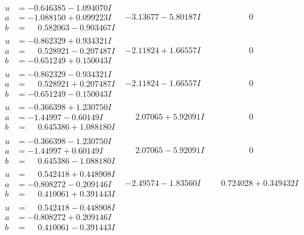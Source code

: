 \documentclass[1p]{elsarticle_modified}
\theoremstyle{definition}
\begin{document}
$$\begin{array}{c|c|c}
\begin{aligned}
u &= -0.646385 - 1.094070 I \\
a &= -1.088150 + 0.099223 I \\
b &= \phantom{-}0.582063 - 0.903467 I\end{aligned}
 & -3.13677 - 5.80187 I & \phantom{-0.000000 } 0 \\ \hline\begin{aligned}
u &= -0.862329 + 0.934321 I \\
a &= \phantom{-}0.528921 - 0.207487 I \\
b &= -0.651249 + 0.150043 I\end{aligned}
 & -2.11824 + 1.66557 I & \phantom{-0.000000 } 0 \\ \hline\begin{aligned}
u &= -0.862329 - 0.934321 I \\
a &= \phantom{-}0.528921 + 0.207487 I \\
b &= -0.651249 - 0.150043 I\end{aligned}
 & -2.11824 - 1.66557 I & \phantom{-0.000000 } 0 \\ \hline\begin{aligned}
u &= -0.366398 + 1.230750 I \\
a &= -1.44997 - 0.60149 I \\
b &= \phantom{-}0.645386 + 1.088180 I\end{aligned}
 & \phantom{-}2.07065 + 5.92091 I & \phantom{-0.000000 } 0 \\ \hline\begin{aligned}
u &= -0.366398 - 1.230750 I \\
a &= -1.44997 + 0.60149 I \\
b &= \phantom{-}0.645386 - 1.088180 I\end{aligned}
 & \phantom{-}2.07065 - 5.92091 I & \phantom{-0.000000 } 0 \\ \hline\begin{aligned}
u &= \phantom{-}0.542418 + 0.448908 I \\
a &= -0.808272 - 0.209146 I \\
b &= \phantom{-}0.410061 + 0.391443 I\end{aligned}
 & -2.49574 - 1.83560 I & \phantom{-}0.724028 + 0.349432 I \\ \hline\begin{aligned}
u &= \phantom{-}0.542418 - 0.448908 I \\
a &= -0.808272 + 0.209146 I \\
b &= \phantom{-}0.410061 - 0.391443 I\end{aligned}

\end{array}$$
\end{document}
